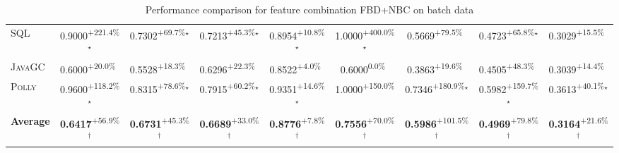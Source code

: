 \begin{table}[htbp]
\begin{tabular}{l|cccc|cccc}
\textsc{SQL} & \cellcolor{green!30}0.9000\textsuperscript{+221.4\%}$^\star$ & \cellcolor{green!30}0.7302\textsuperscript{+69.7\%}$^\star$ & \cellcolor{green!30}0.7213\textsuperscript{+45.3\%}$^\star$ & \cellcolor{green!30}0.8954\textsuperscript{+10.8\%}$^\star$ & \cellcolor{green!30}1.0000\textsuperscript{+400.0\%}$^\star$ & \cellcolor{green!30}0.5669\textsuperscript{+79.5\%}$^{\,\,\,}$ & \cellcolor{green!30}0.4723\textsuperscript{+65.8\%}$^\star$ & \cellcolor{green!30}0.3029\textsuperscript{+15.5\%}$^{\,\,\,}$ \\
\textsc{JavaGC} & \cellcolor{green!30}0.6000\textsuperscript{+20.0\%}$^{\,\,\,}$ & \cellcolor{green!30}0.5528\textsuperscript{+18.3\%}$^{\,\,\,}$ & \cellcolor{green!30}0.6296\textsuperscript{+22.3\%}$^{\,\,\,}$ & \cellcolor{green!30}0.8522\textsuperscript{+4.0\%}$^{\,\,\,}$ & \cellcolor{red!30}0.6000\textsuperscript{0.0\%}$^{\,\,\,}$ & \cellcolor{green!30}0.3863\textsuperscript{+19.6\%}$^{\,\,\,}$ & \cellcolor{green!30}0.4505\textsuperscript{+48.3\%}$^{\,\,\,}$ & \cellcolor{green!30}0.3039\textsuperscript{+14.4\%}$^{\,\,\,}$ \\
\textsc{Polly} & \cellcolor{green!30}0.9600\textsuperscript{+118.2\%}$^\star$ & \cellcolor{green!30}0.8315\textsuperscript{+78.6\%}$^\star$ & \cellcolor{green!30}0.7915\textsuperscript{+60.2\%}$^\star$ & \cellcolor{green!30}0.9351\textsuperscript{+14.6\%}$^\star$ & \cellcolor{green!30}1.0000\textsuperscript{+150.0\%}$^{\,\,\,}$ & \cellcolor{green!30}0.7346\textsuperscript{+180.9\%}$^\star$ & \cellcolor{green!30}0.5982\textsuperscript{+159.7\%}$^\star$ & \cellcolor{green!30}0.3613\textsuperscript{+40.1\%}$^\star$ \\
\hline
\textbf{Average} & \cellcolor{green!30}\textbf{0.6417}\textsuperscript{+56.9\%}$^\dagger$ & \cellcolor{green!30}\textbf{0.6731}\textsuperscript{+45.3\%}$^\dagger$ & \cellcolor{green!30}\textbf{0.6689}\textsuperscript{+33.0\%}$^\dagger$ & \cellcolor{green!30}\textbf{0.8776}\textsuperscript{+7.8\%}$^\dagger$ & \cellcolor{green!30}\textbf{0.7556}\textsuperscript{+70.0\%}$^\dagger$ & \cellcolor{green!30}\textbf{0.5986}\textsuperscript{+101.5\%}$^\dagger$ & \cellcolor{green!30}\textbf{0.4969}\textsuperscript{+79.8\%}$^\dagger$ & \cellcolor{green!30}\textbf{0.3164}\textsuperscript{+21.6\%}$^\dagger$ \\
\hline
\end{tabular}
\caption{Performance comparison for feature combination FBD+NBC on batch data}
\label{tab:combo_FBD_NBC_performance_batch}
\end{table}